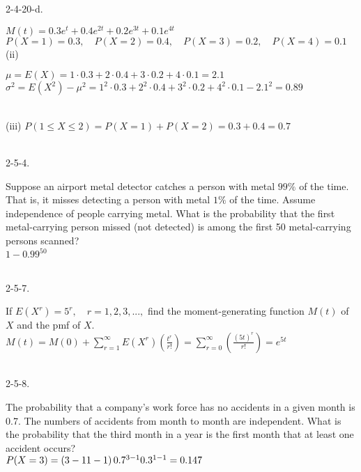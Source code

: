 \documentclass[12pt]{book}
\begin{document}
\begin{CJK}{UTF8}{bsmi}
2-4-20-d. \begin{minipage}[t]{\dimexpr\linewidth-2em}
$\displaystyle M(t)=0.3e^t+0.4e^{2t}+0.2e^{3t}+0.1e^{4t}$ \\
$P(X=1)=0.3,\quad P(X=2)=0.4,\quad P(X=3)=0.2,\quad P(X=4)=0.1$ \\
(ii) \begin{minipage}[t]{\dimexpr\linewidth}
$\displaystyle \mu=E(X)=1\cdot0.3+2\cdot0.4+3\cdot0.2+4\cdot0.1=2.1$ \\
$\sigma^2=E(X^2)-\mu^2=1^2\cdot0.3+2^2\cdot0.4+3^2\cdot0.2+4^2\cdot0.1-2.1^2=0.89$
\end{minipage}\\[5pt]
(iii) $P(1 \le X \le 2)=P(X=1)+P(X=2)=0.3+0.4=0.7$
\end{minipage}\\

2-5-4. \begin{minipage}[t]{\dimexpr\linewidth-2em}
Suppose an airport metal detector catches a person with metal $99\%$ of the time. That is, it misses detecting a person with metal $1\%$ of the time. Assume independence of people carrying metal. What is the probability that the first metal-carrying person missed (not detected) is among the first 50 metal-carrying persons scanned? \\
$1-0.99^{50}$
\end{minipage}\\

2-5-7. \begin{minipage}[t]{\dimexpr\linewidth-2em}
If $E(X^r) = 5^r,\quad r = 1, 2, 3, ...,$ find the moment-generating function $M(t)$ of $X$ and the pmf of $X$. \\
$\displaystyle M(t)=M(0)+\sum_{r=1}^{\infty}E(X^r)\left(\frac{t^r}{r!}\right)=\sum_{r=0}^{\infty}\left(\frac{(5t)^r}{r!}\right)=e^{5t}$
\end{minipage}\\

2-5-8. \begin{minipage}[t]{\dimexpr\linewidth-2em}
The probability that a company’s work force has no accidents in a given month is 0.7. The numbers of accidents from month to month are independent. What is the probability that the third month in a year is the first month that at least one accident occurs? \\
$P(X=3)=\left(3-1\\1-1\right)0.7^{3-1}0.3^{1-1}=0.147$
\end{minipage}\\


\end{CJK}
\end{document}
